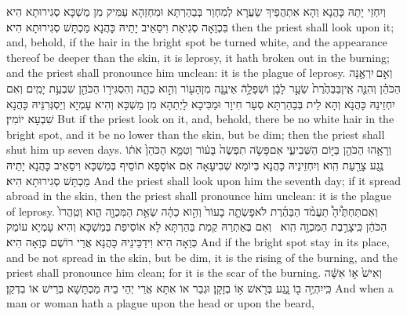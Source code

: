 {וְיִחְזֵי יָתַהּ כָּהֲנָא וְהָא אִתְהֲפֵיךְ שַׂעֲרָא לְמִחְוַר בְּבַהַרְתָּא וּמִחְזַהָא עַמִּיק מִן מַשְׁכָּא סְגִירוּתָא הִיא בִּכְוַאָה סְגִיאַת וִיסַאֵיב יָתֵיהּ כָּהֲנָא מַכְתָּשׁ סְגִירוּתָא הִיא׃}
{then the priest shall look upon it; and, behold, if the hair in the bright spot be turned white, and the appearance thereof be deeper than the skin, it is leprosy, it hath broken out in the burning; and the priest shall pronounce him unclean: it is the plague of leprosy.}{}
{וְאִ֣ם \legarmeh  יִרְאֶ֣נָּה הַכֹּהֵ֗ן וְהִנֵּ֤ה אֵֽין\maqqaf בַּבַּהֶ֙רֶת֙ שֵׂעָ֣ר לָבָ֔ן וּשְׁפָלָ֥הֿ אֵינֶ֛נָּה מִן\maqqaf הָע֖וֹר וְהִ֣וא כֵהָ֑ה וְהִסְגִּיר֥וֹ הַכֹּהֵ֖ן שִׁבְעַ֥ת יָמִֽים׃}
{וְאִם יִחְזֵינַהּ כָּהֲנָא וְהָא לֵית בְּבַהַרְתָּא סְעַר חִיוָר וּמַכִּיכָא לָיְתַהָא מִן מַשְׁכָּא וְהִיא עָמְיָא וְיַסְגְּרִנֵּיהּ כָּהֲנָא שִׁבְעָא יוֹמִין׃}
{But if the priest look on it, and, behold, there be no white hair in the bright spot, and it be no lower than the skin, but be dim; then the priest shall shut him up seven days.}{}
{וְרָאָ֥הוּ הַכֹּהֵ֖ן בַּיּ֣וֹם הַשְּׁבִיעִ֑י אִם\maqqaf פָּשֹׂ֤ה תִפְשֶׂה֙ בָּע֔וֹר וְטִמֵּ֤א הַכֹּהֵן֙ אֹת֔וֹ נֶ֥גַע צָרַ֖עַת הִֽוא׃}
{וְיִחְזֵינֵיהּ כָּהֲנָא בְּיוֹמָא שְׁבִיעָאָה אִם אוֹסָפָא תוֹסֵיף בְּמַשְׁכָּא וִיסַאֵיב כָּהֲנָא יָתֵיהּ מַכְתָּשׁ סְגִירוּתָא הִיא׃}
{And the priest shall look upon him the seventh day; if it spread abroad in the skin, then the priest shall pronounce him unclean: it is the plague of leprosy.}{}
{וְאִם\maqqaf תַּחְתֶּ֩יהָ֩ תַעֲמֹ֨ד הַבַּהֶ֜רֶת לֹא\maqqaf פָשְׂתָ֤ה בָעוֹר֙ וְהִ֣וא כֵהָ֔ה שְׂאֵ֥ת הַמִּכְוָ֖ה הִ֑וא וְטִֽהֲרוֹ֙ הַכֹּהֵ֔ן כִּֽי\maqqaf צָרֶ֥בֶת הַמִּכְוָ֖ה הִֽוא׃ \petucha }
{וְאִם בְּאַתְרַהּ קַמַת בַּהַרְתָּא לָא אוֹסֵיפַת בְּמַשְׁכָּא וְהִיא עָמְיָא עוֹמֶק כְּוַאָה הִיא וִידַכֵּינֵיהּ כָּהֲנָא אֲרֵי רוֹשֶׁם כְּוַאָה הִיא׃}
{And if the bright spot stay in its place, and be not spread in the skin, but be dim, it is the rising of the burning, and the priest shall pronounce him clean; for it is the scar of the burning.}{}
{וְאִישׁ֙ א֣וֹ אִשָּׁ֔ה כִּֽי\maqqaf יִהְיֶ֥ה ב֖וֹ נָ֑גַע בְּרֹ֖אשׁ א֥וֹ בְזָקָֽן׃}
{וּגְבַר אוֹ אִתָּא אֲרֵי יְהֵי בֵיהּ מַכְתָּשָׁא בְּרֵישׁ אוֹ בִדְקַן׃}
{And when a man or woman hath a plague upon the head or upon the beard,}{}
